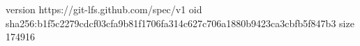 version https://git-lfs.github.com/spec/v1
oid sha256:b1f5c2279cdcf03cfa9b81f1706fa314c627c706a1880b9423ca3cbfb5f847b3
size 174916
